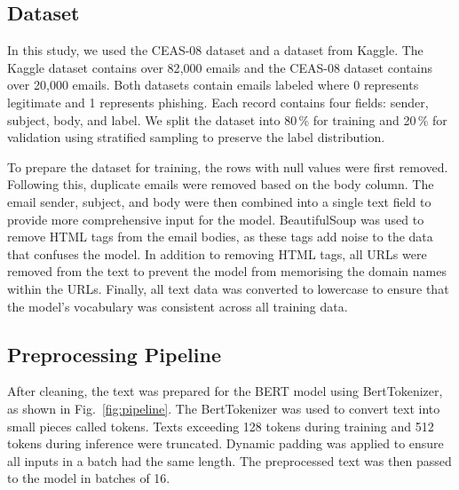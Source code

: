 \documentclass[conference]{IEEEtran}
\begin{document}
\subsection{Dataset}

In this study, we used the CEAS-08 dataset and a dataset from
Kaggle. The Kaggle dataset contains over 82{,}000 emails and the
CEAS-08 dataset contains over 20{,}000 emails. Both datasets
contain emails labeled where 0 represents legitimate and 1
represents phishing. Each record contains four fields: sender,
subject, body, and label. We split the dataset into 80\,\% for
training and 20\,\% for validation using stratified sampling to
preserve the label distribution.

To prepare the dataset for training, the rows with null values
were first removed. Following this, duplicate emails were removed
based on the body column. The email sender, subject, and body were
then combined into a single text field to provide more
comprehensive input for the model. BeautifulSoup was used to
remove HTML tags from the email bodies, as these tags add noise to
the data that confuses the model. In addition to removing HTML
tags, all URLs were removed from the text to prevent the model
from memorising the domain names within the URLs. Finally, all
text data was converted to lowercase to ensure that the model's
vocabulary was consistent across all training data.

\subsection{Preprocessing Pipeline}

After cleaning, the text was prepared for the BERT model using
BertTokenizer, as shown in Fig.~\ref{fig:pipeline}. The
BertTokenizer was used to convert text into small pieces called
tokens. Texts exceeding 128 tokens during training and 512 tokens
during inference were truncated. Dynamic padding was applied to
ensure all inputs in a batch had the same length. The preprocessed
text was then passed to the model in batches of 16.
\end{document}
